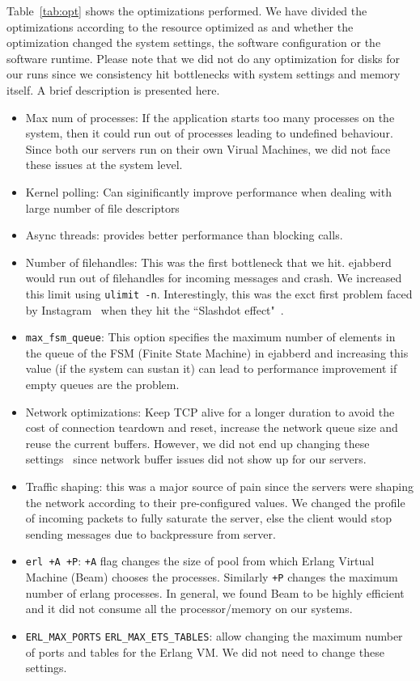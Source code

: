 \documentclass[a4paper, twocolumn]{article}
\begin{document}
Table~\ref{tab:opt} shows the optimizations performed. We have divided the optimizations according to the resource optimized as and whether the optimization changed the system settings, the software configuration or the software runtime. Please note that we did not do any optimization for disks for our runs since we consistency hit bottlenecks with system settings and memory itself. A brief description is presented here. 
\begin{itemize}
\item Max num of processes: If the application starts too many processes on the system, then it could run out of processes leading to undefined behaviour. Since both our servers run on their own Virual Machines, we did not face these issues at the system level. 
\item Kernel polling: Can siginificantly improve performance when dealing with large number of file descriptors 
\item Async threads: provides better performance than blocking calls. 
\item Number of filehandles: This was the first bottleneck that we hit. ejabberd would run out of filehandles for incoming messages and crash. We increased this limit using \texttt{ulimit -n}. Interestingly, this was the exct first problem faced by Instagram~\cite{instagram_ppt} when they hit the ``Slashdot effect"~\cite{slashdot}. 
\item \texttt{max\_fsm\_queue}: This option specifies the maximum number of elements in the queue of the FSM (Finite State Machine) in ejabberd and increasing this value (if the system can sustan it) can lead to performance improvement if empty queues are the problem. 
\item Network optimizations: Keep TCP alive for a longer duration to avoid the cost of connection teardown and reset, increase the network queue size and reuse the current buffers. However, we did not end up changing these settings~\cite{network_tuning} since network buffer issues did not show up for our servers. 
\item Traffic shaping: this was a major source of pain since the servers were shaping the network according to their pre-configured values. We changed the profile of incoming packets to fully saturate the server, else the client would stop sending messages due to backpressure from server. 
\item \texttt{erl +A +P}: \texttt{+A} flag changes the size of pool from which Erlang Virtual Machine (Beam) chooses the processes. Similarly \texttt{+P} changes the maximum number of erlang processes. In general, we found Beam to be highly efficient and it did not consume all the processor/memory on our systems. 
\item \texttt{ERL\_MAX\_PORTS} \texttt{ERL\_MAX\_ETS\_TABLES}: allow changing the maximum number of ports and tables for the Erlang VM. We did not need to change these settings. 
\end{itemize}
\end{document}
